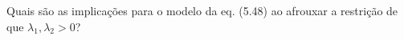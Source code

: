 Quais são as implicações para o modelo da eq. (5.48) ao afrouxar a restrição de que $\lambda_1, \lambda_2 > 0$?
